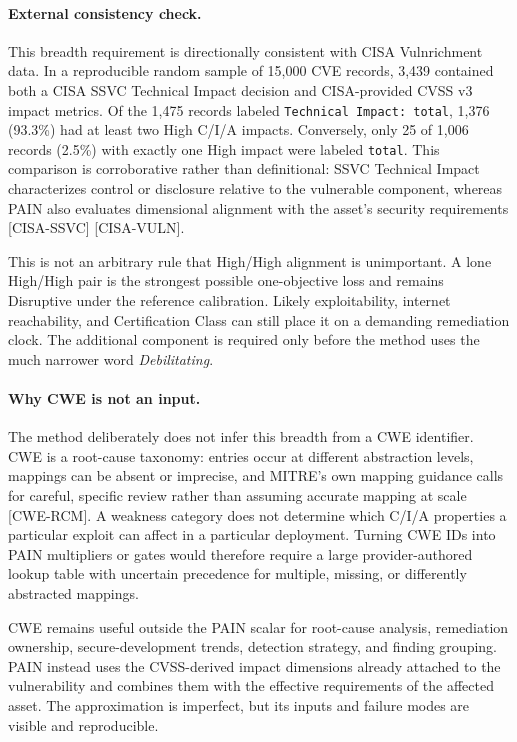 \documentclass[11pt]{article}
\newcommand{\code}[1]{\texttt{#1}}
\begin{document}
\paragraph{External consistency check.}
This breadth requirement is directionally consistent with CISA Vulnrichment data.
In a reproducible random sample of 15,000 CVE records, 3,439 contained both a CISA
SSVC Technical Impact decision and CISA-provided CVSS v3 impact metrics. Of the
1,475 records labeled \code{Technical Impact: total}, 1,376 (93.3\%) had at least
two High C/I/A impacts. Conversely, only 25 of 1,006 records (2.5\%) with exactly
one High impact were labeled \code{total}. This comparison is corroborative rather
than definitional: SSVC Technical Impact characterizes control or disclosure
relative to the vulnerable component, whereas PAIN also evaluates dimensional
alignment with the asset's security requirements \mbox{[CISA-SSVC]}
\mbox{[CISA-VULN]}.

This is not an arbitrary rule that High/High alignment is unimportant. A lone
High/High pair is the strongest possible one-objective loss and remains Disruptive
under the reference calibration. Likely exploitability, internet reachability, and
Certification Class can still place it on a demanding remediation clock. The
additional component is required only before the method uses the much narrower
word \emph{Debilitating}.

\paragraph{Why CWE is not an input.}
The method deliberately does not infer this breadth from a CWE identifier. CWE is
a root-cause taxonomy: entries occur at different abstraction levels, mappings can
be absent or imprecise, and MITRE's own mapping guidance calls for careful,
specific review rather than assuming accurate mapping at scale
\mbox{[CWE-RCM]}. A weakness category does not determine which C/I/A properties a
particular exploit can affect in a particular deployment. Turning CWE IDs into
PAIN multipliers or gates would therefore require a large provider-authored lookup
table with uncertain precedence for multiple, missing, or differently abstracted
mappings.

CWE remains useful outside the PAIN scalar for root-cause analysis, remediation
ownership, secure-development trends, detection strategy, and finding grouping.
PAIN instead uses the CVSS-derived impact dimensions already attached to the
vulnerability and combines them with the effective requirements of the affected
asset. The approximation is imperfect, but its inputs and failure modes are visible
and reproducible.
\end{document}
